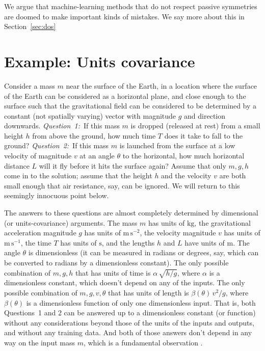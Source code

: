\documentclass{article}
\theoremstyle{plain}
\theoremstyle{definition}
\theoremstyle{remark}
\newcommand{\sectionname}{Section}
\newcommand{\secref}[1]{\sectionname~\ref{#1}}
\newcommand{\unit}[1]{\mathrm{#1}}
\newcommand{\kg}{\unit{kg}}
\newcommand{\m}{\unit{m}}
\newcommand{\s}{\unit{s}}
\begin{document}
We argue that machine-learning methods that do not respect passive symmetries are doomed to make important kinds of mistakes.
We say more about this in \secref{sec:dos}

\section{Example: Units covariance}\label{sec:units}

Consider a mass $m$ near the surface of the Earth, in a location where the surface of the Earth can be considered as a horizontal plane, and close enough to the surface such that the gravitational field can be considered to be determined by a constant (not spatially varying) vector with magnitude $g$ and direction downwards.
\textsl{Question~1:}~If this mass $m$ is dropped (released at rest) from a small height $h$ from above the ground, how much time $T$ does it take to fall to the ground?
\textsl{Question~2:}~If this mass $m$ is launched from the surface at a low velocity of magnitude $v$ at an angle $\theta$ to the horizontal, how much horizontal distance $L$ will it fly before it hits the surface again?
Assume that only $m, g, h$ come in to the solution; assume that the height $h$ and the velocity $v$ are both small enough that air resistance, say, can be ignored.
We will return to this seemingly innocuous point below.

The answers to these questions are almost completely determined by dimensional (or units-covariance) arguments.
The mass $m$ has units of $\kg$, the gravitational acceleration magnitude $g$ has units of $\m\,\s^{-2}$, the velocity magnitude $v$ has units of $\m\,\s^{-1}$, the time $T$ has units of $\s$, and the lengths $h$ and $L$ have units of $\m$.
The angle $\theta$ is dimensionless (it can be measured in radians or degrees, say, which can be converted to radians by a dimensionless constant).
The only possible combination of $m, g, h$ that has units of time is $\alpha\,\sqrt{h/g}$, where $\alpha$ is a dimensionless constant, which doesn't depend on any of the inputs.
The only possible combination of $m, g, v, \theta$ that has units of length is $\beta(\theta)\,v^2/g$, where $\beta(\theta)$ is a dimensionless function of only one dimensionless input.
That is, both Questions~1 and 2 can be answered up to a dimensionless constant (or function) without any considerations beyond those of the units of the inputs and outputs, and without any training data.
And both of those answers don't depend in any way on the input mass $m$, which is a fundamental observation \cite{gr}.
\end{document}
